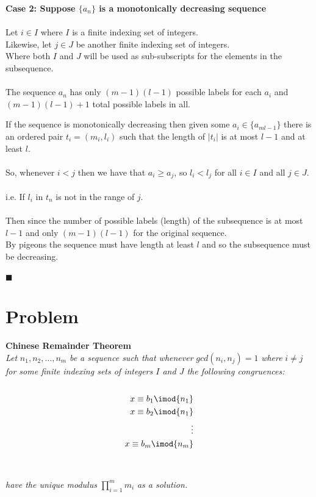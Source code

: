 \documentclass{article}
\begin{document}
  \textbf{Case 2: Suppose $\{a_{n}\}$ is a monotonically decreasing sequence}
  \\ \\
  Let $i \in I$ where $I$ is a finite indexing set of integers.
  \\ 
  Likewise, let $j \in J$ be another finite indexing set of integers. 
  \\ 
  Where both $I$ and $J$ will be used as sub-subscripts for the elements in the subsequence. 
  \\ \\
  The sequence $a_{n}$ has only $(m-1)(l-1)$ possible labels for each $a_{i}$ and $(m-1)(l-1)+1$ total possible labels in all.
  \bigskip
  
  \pagebreak
  
  
  If the sequence is monotonically decreasing then given some $a_{i} \in \{a_{ml-1}\}$ there is an ordered pair $t_{i} = (m_{i}, l_{i})$ such that the length of $|t_{i}|$ is at most $l-1$ and at least $l$.
  \\ \\ 
  So, whenever $i < j$ then we have that $a_{i} \geq a_{j}$, so $l_{i} < l_{j}$ for all $i \in I$ and all $j \in J$.
  \\ \\
  i.e. If $l_{i}$ in $t_{n}$ is not in the range of $j$.
  \\ \\
  Then since the number of possible labels (length) of the subsequence is at most $l-1$ and only $(m-1)(l-1)$ for the original sequence. 
  \\ 
  By pigeons the sequence must have length at least $l$ and so the subsequence must be decreasing.
  \\ \\
  $\blacksquare$

\bigskip

\section*{Problem}
    \textbf{Chinese Remainder Theorem}
    \\
    \textit{Let} $n_{1},n_{2},\ldots,n_{m}$ \textit{be a sequence such that whenever} $gcd(n_{i},n_{j}) =1$ \textit{where} $i \neq j$ \textit{for some finite indexing sets of integers $I$ and $J$ the following congruences:} 
    \\ \\
    \begin{align}
        x \equiv  b_{1}\imod{n_{1}}  \\ 
        x \equiv  b_{2}\imod{n_{1}}  \\
        \vdots                       \\
        x \equiv  b_{m}\imod{n_{m}}  \\
    \end{align}
    \\ \\
    \textit{have the unique modulus}
    $\prod_{i=1}^{m} m_{i}$ \textit{as a solution.}
    
\end{document}
